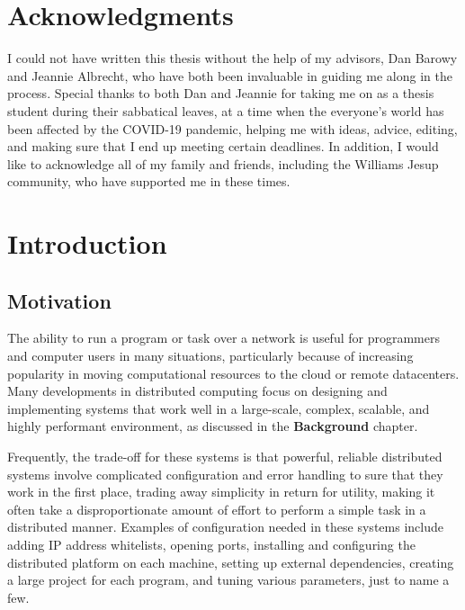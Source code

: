 \documentclass[oneside]{report}
\begin{document}
\chapter*{Acknowledgments}

I could not have written this thesis without the help of my advisors, Dan Barowy and Jeannie Albrecht, who have both been invaluable in guiding me along in the process. Special thanks to both Dan and Jeannie for taking me on as a thesis student during their sabbatical leaves, at a time when the everyone's world has been affected by the COVID-19 pandemic, helping me with ideas, advice, editing, and making sure that I end up meeting certain deadlines. In addition, I would like to acknowledge all of my family and friends, including the Williams Jesup community, who have supported me in these times.


\chapter{Introduction}

\section{Motivation}

The ability to run a program or task over a network is useful for programmers and computer users in many situations, particularly because of increasing popularity in moving computational resources to the cloud or remote datacenters.
Many developments in distributed computing focus on designing and implementing systems that work well in a large-scale, complex, scalable, and highly performant environment, as discussed in the \textbf{Background} chapter.

Frequently, the trade-off for these systems is that powerful, reliable distributed systems involve  complicated configuration and error handling to sure that they work in the first place, trading away simplicity in return for utility, making it often take a disproportionate amount of effort to perform a simple task in a distributed manner.
Examples of configuration needed in these systems include adding IP address whitelists, opening ports, installing and configuring the distributed platform on each machine, setting up external dependencies, creating a large project for each program, and tuning various parameters, just to name a few.
\end{document}
